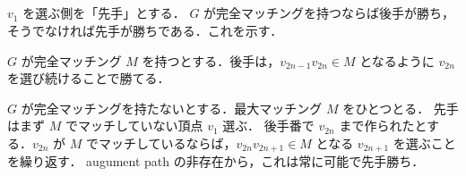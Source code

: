 \subsection{}
$v_1$ を選ぶ側を「先手」とする．
$G$ が完全マッチングを持つならば後手が勝ち，そうでなければ先手が勝ちである．これを示す．

$G$ が完全マッチング $M$ を持つとする．後手は，$v_{2n-1}v_{2n} \in M$ となるように $v_{2n}$ を選び続けることで勝てる．

$G$ が完全マッチングを持たないとする．最大マッチング $M$ をひとつとる．
先手はまず $M$ でマッチしていない頂点 $v_1$ 選ぶ．
後手番で $v_{2n}$ まで作られたとする．$v_{2n}$ が $M$ でマッチしているならば，$v_{2n}v_{2n+1}\in M$ となる $v_{2n+1}$ を選ぶことを繰り返す．
augument path の非存在から，これは常に可能で先手勝ち．

